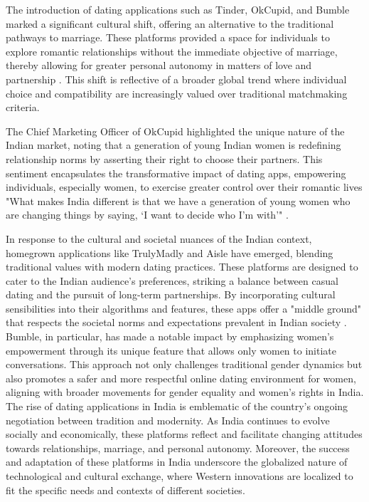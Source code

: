The introduction of dating applications such as Tinder, OkCupid, and Bumble marked a significant cultural shift, offering an alternative to the traditional pathways to marriage. These platforms provided a space for individuals to explore romantic relationships without the immediate objective of marriage, thereby allowing for greater personal autonomy in matters of love and partnership \cite{Das_2019}. This shift is reflective of a broader global trend where individual choice and compatibility are increasingly valued over traditional matchmaking criteria.

The Chief Marketing Officer of OkCupid highlighted the unique nature of the Indian market, noting that a generation of young Indian women is redefining relationship norms by asserting their right to choose their partners. This sentiment encapsulates the transformative impact of dating apps, empowering individuals, especially women, to exercise greater control over their romantic lives "What makes India different is that we have a generation of young women who are changing things by saying, ‘I want to decide who I’m with’" \cite{Forbes_2020}.

In response to the cultural and societal nuances of the Indian context, homegrown applications like TrulyMadly and Aisle have emerged, blending traditional values with modern dating practices. These platforms are designed to cater to the Indian audience's preferences, striking a balance between casual dating and the pursuit of long-term partnerships. By incorporating cultural sensibilities into their algorithms and features, these apps offer a "middle ground" that respects the societal norms and expectations prevalent in Indian society \cite{Forbes_2020}. Bumble, in particular, has made a notable impact by emphasizing women's empowerment through its unique feature that allows only women to initiate conversations.\cite{noauthor_bumble_nodate} This approach not only challenges traditional gender dynamics but also promotes a safer and more respectful online dating environment for women, aligning with broader movements for gender equality and women's rights in India. The rise of dating applications in India is emblematic of the country's ongoing negotiation between tradition and modernity. As India continues to evolve socially and economically, these platforms reflect and facilitate changing attitudes towards relationships, marriage, and personal autonomy. Moreover, the success and adaptation of these platforms in India underscore the globalized nature of technological and cultural exchange, where Western innovations are localized to fit the specific needs and contexts of different societies.

